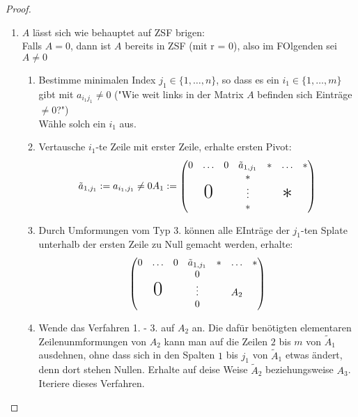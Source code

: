\documentclass[a4paper]{scrartcl}
\theoremstyle{definition}
\theoremstyle{plain}
\theoremstyle{plain}
\theoremstyle{remark}
\theoremstyle{remark}
\theoremstyle{remark}
\theoremstyle{remark}
\theoremstyle{remark}
\begin{document}
\begin{proof}
\begin{enumerate}
\item $A$ lässt sich wie behauptet auf ZSF brigen: \\
     Falls $A = 0$, dann ist $A$ bereits in ZSF (mit r = 0), also im FOlgenden sei $A \neq 0$ \\
\begin{enumerate}
\item Bestimme minimalen Index $j_1 \in \{1, \ldots, n\}$, so dass es ein $i_1 \in \{1, \ldots, m\}$ gibt mit $a_{i_1 j_1} \neq 0$ ("Wie weit links in der Matrix $A$ befinden sich Einträge $\neq 0$?") \\
        Wähle solch ein $i_1$ aus.
\item Vertausche $i_1$-te Zeile mit erster Zeile, erhalte ersten Pivot:
\begin{equation}
\tilde a_{1, j_1} := a_{i_1, j_1} \neq 0 \\
A_1 :=
\begin{pmatrix}
0 & \ldots & 0 & \tilde a_{1, j_1} & \ast & \ldots & \ast \\
  &        &   &       \ast        &  & & \\
& \text{\huge0} & & \vdots & & \text{\huge$\ast$} & \\
& & & \ast & & & \\
\end{pmatrix}
\end{equation}
\item Durch Umformungen vom Typ 3. können alle EInträge der $j_1$-ten Splate unterhalb der ersten Zeile zu Null gemacht werden, erhalte:
\begin{equation}
\begin{pmatrix}
0 & \ldots & 0 & \tilde a_{1, j_1} & \ast & \ldots & \ast \\
  &        &   &       0        &  & & \\
& \text{\huge0} & & \vdots & & A_2 & \\
& & & 0 & & & \\
\end{pmatrix}
\end{equation}
\item Wende das Verfahren 1. - 3. auf $A_2$ an. Die dafür benötigten elementaren Zeilenunmformungen von $A_2$ kann man
auf die Zeilen $2$ bis $m$ von $\tilde A_1$ ausdehnen, ohne dass sich in den Spalten $1$ bis $j_1$ von $\tilde A_1$ etwas ändert, denn
dort stehen Nullen. Erhalte auf deise Weise $\tilde A_2$ beziehungsweise $A_3$. Iteriere dieses Verfahren.

\end{enumerate}
\end{enumerate}
\end{proof}
\end{document}
